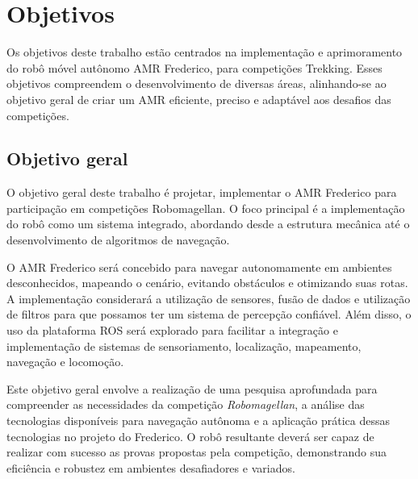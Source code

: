 \section{\textbf{Objetivos}}
Os objetivos deste trabalho estão centrados na implementação e aprimoramento do robô móvel autônomo AMR Frederico, para competições Trekking. Esses objetivos compreendem o desenvolvimento de diversas áreas, alinhando-se ao objetivo geral de criar um AMR eficiente, preciso e adaptável aos desafios das competições.

\subsection{Objetivo geral}
O objetivo geral deste trabalho é projetar, implementar o AMR Frederico para participação em competições Robomagellan. O foco principal é a implementação do robô como um sistema integrado, abordando desde a estrutura mecânica até o desenvolvimento de algoritmos de navegação.

O AMR Frederico será concebido para navegar autonomamente em ambientes desconhecidos, mapeando o cenário, evitando obstáculos e otimizando suas rotas. A implementação considerará a utilização de sensores, fusão de dados e utilização de filtros para que possamos ter um sistema de percepção confiável. Além disso, o uso da plataforma ROS será explorado para facilitar a integração e implementação de sistemas de sensoriamento, localização, mapeamento, navegação e locomoção.

Este objetivo geral envolve a realização de uma pesquisa aprofundada para compreender as necessidades da competição \textit{Robomagellan}, a análise das tecnologias disponíveis para navegação autônoma e a aplicação prática dessas tecnologias no projeto do Frederico. O robô resultante deverá ser capaz de realizar com sucesso as provas propostas pela competição, demonstrando sua eficiência e robustez em ambientes desafiadores e variados.


